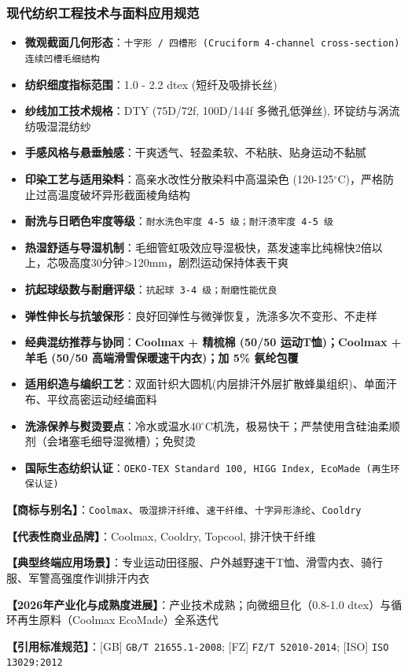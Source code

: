 \documentclass[11pt,openright,twoside,UTF8]{ctexbook}
\begin{document}
\subsubsection*{现代纺织工程技术与面料应用规范}
\begin{itemize} \setlength{\itemsep}{2pt}
    \item \textbf{微观截面几何形态}：\texttt{十字形 / 四槽形 (Cruciform 4-channel cross-section) 连续凹槽毛细结构}
    \item \textbf{纺织细度指标范围}：1.0 - 2.2 dtex (短纤及吸排长丝)
    \item \textbf{纱线加工技术规格}：DTY (75D/72f, 100D/144f 多微孔低弹丝), 环锭纺与涡流纺吸湿混纺纱
    \item \textbf{手感风格与悬垂触感}：干爽透气、轻盈柔软、不粘肤、贴身运动不黏腻
    \item \textbf{印染工艺与适用染料}：高亲水改性分散染料中高温染色 (120-125$^\circ\mathrm{C}$)，严格防止过高温度破坏异形截面棱角结构
    \item \textbf{耐洗与日晒色牢度等级}：\texttt{耐水洗色牢度 4-5 级；耐汗渍牢度 4-5 级}
    \item \textbf{热湿舒适与导湿机制}：毛细管虹吸效应导湿极快，蒸发速率比纯棉快2倍以上，芯吸高度30分钟\textgreater{}120mm，剧烈运动保持体表干爽
    \item \textbf{抗起球级数与耐磨评级}：\texttt{抗起球 3-4 级；耐磨性能优良}
    \item \textbf{弹性伸长与抗皱保形}：良好回弹性与微弹恢复，洗涤多次不变形、不走样
    \item \textbf{经典混纺推荐与协同}：\textbf{Coolmax + 精梳棉 (50/50 运动T恤)；Coolmax + 羊毛 (50/50 高端滑雪保暖速干内衣)；加 5\% 氨纶包覆}
    \item \textbf{适用织造与编织工艺}：双面针织大圆机(内层排汗外层扩散蜂巢组织)、单面汗布、平纹高密运动经编面料
    \item \textbf{洗涤保养与熨烫要点}：冷水或温水40$^\circ\mathrm{C}$机洗，极易快干；严禁使用含硅油柔顺剂（会堵塞毛细导湿微槽）；免熨烫
    \item \textbf{国际生态纺织认证}：\texttt{OEKO-TEX Standard 100, HIGG Index, EcoMade (再生环保认证)}
\end{itemize}
\vspace{0.2cm}

\noindent\textbf{【商标与别名】}：\texttt{Coolmax}、\texttt{吸湿排汗纤维}、\texttt{速干纤维}、\texttt{十字异形涤纶}、\texttt{Cooldry}\par
\noindent\textbf{【代表性商业品牌】}：Coolmax, Cooldry, Topcool, 排汗快干纤维\par
\noindent\textbf{【典型终端应用场景】}：专业运动田径服、户外越野速干T恤、滑雪内衣、骑行服、军警高强度作训排汗内衣\par
\noindent\textbf{【2026年产业化与成熟度进展】}：产业技术成熟；向微细旦化（0.8-1.0 dtex）与循环再生原料（Coolmax EcoMade）全系迭代\par
\noindent\textbf{【引用标准规范】}：[GB] \texttt{GB/T 21655.1-2008}; [FZ] \texttt{FZ/T 52010-2014}; [ISO] \texttt{ISO 13029:2012}\par
\vspace{0.5cm}
\end{document}
